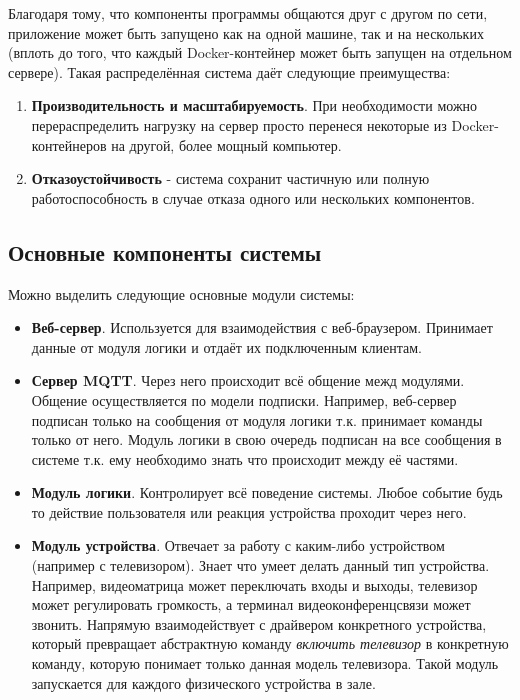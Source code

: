 \noindent Благодаря тому, что компоненты программы общаются друг с другом по сети, приложение может быть запущено как
на одной машине, так и на нескольких (вплоть до того, что каждый Docker-контейнер может быть запущен на отдельном сервере).
Такая распределённая система даёт следующие преимущества:
\begin{enumerate}
    \item \textbf{Производительность и масштабируемость}. При необходимости можно перераспределить нагрузку на сервер
    просто перенеся некоторые из Docker-контейнеров на другой, более мощный компьютер.
    \item \textbf{Отказоустойчивость} - система сохранит частичную или полную работоспособность в случае отказа одного
    или нескольких компонентов.
\end{enumerate}

\subsection{Основные компоненты системы}

Можно выделить следующие основные модули системы:

\begin{itemize}
    \item \textbf{Веб-сервер}. Используется для взаимодействия с веб-браузером. Принимает данные от модуля логики и отдаёт
    их подключенным клиентам.
    \item \textbf{Сервер MQTT}. Через него происходит всё общение межд модулями. Общение осуществляется по модели подписки.
    Например, веб-сервер подписан только на сообщения от модуля логики т.к. принимает команды только от него. Модуль
    логики в свою очередь подписан на все сообщения в системе т.к. ему необходимо знать что происходит между её частями.
    \item \textbf{Модуль логики}. Контролирует всё поведение системы. Любое событие будь то действие пользователя или реакция
    устройства проходит через него.
    \item \textbf{Модуль устройства}. Отвечает за работу с каким-либо устройством (например с телевизором). Знает что умеет
    делать данный тип устройства. Например, видеоматрица может переключать входы и выходы, телевизор может регулировать
    громкость, а терминал видеоконференцсвязи может звонить. Напрямую взаимодействует с драйвером конкретного устройства,
    который превращает абстрактную команду \textit{включить телевизор} в конкретную команду, которую понимает только данная
    модель телевизора. Такой модуль запускается для каждого физического устройства в зале.
\end{itemize}

